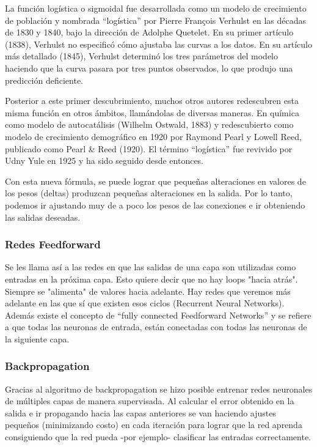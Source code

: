 \documentclass[a4paper]{article}
\begin{document}
La función logística o sigmoidal fue desarrollada como un modelo 
de crecimiento de población y nombrada ``logística'' por Pierre 
François Verhulst en las décadas de 1830 y 1840, bajo la dirección 
de Adolphe Quetelet\cite{wikipierre}.
En su primer artículo (1838), Verhulst no especificó cómo ajustaba 
las curvas a los datos. En su artículo más detallado (1845), 
Verhulst determinó los tres parámetros del modelo haciendo que la 
curva pasara por tres puntos observados, lo que produjo una 
predicción deficiente.

Posterior a este primer descubrimiento, muchos otros autores
redescubren esta misma función en otros ámbitos, llamándolas de
diversas maneras. En química como modelo de autocatálisis (Wilhelm 
Ostwald, 1883) y redescubierto como modelo de crecimiento
demográfico en 1920 por Raymond Pearl y Lowell Reed, publicado 
como Pearl \& Reed (1920). El término ``logística'' fue revivido 
por Udny Yule en 1925 y ha sido seguido desde entonces.


Con esta nueva fórmula, se puede lograr que pequeñas alteraciones 
en valores de los pesos (deltas) produzcan pequeñas alteraciones 
en la salida. Por lo tanto, podemos ir ajustando muy de a poco los 
pesos de las conexiones e ir obteniendo las salidas deseadas.

\subsubsection{Redes Feedforward}

Se les llama así a las redes en que las salidas de una capa son 
utilizadas como entradas en la próxima capa. Esto quiere decir que 
no hay loops "hacia atrás". Siempre se "alimenta" de valores hacia 
adelante. Hay redes que veremos más adelante en las que sí que 
existen esos ciclos (Recurrent Neural Networks). Además existe el 
concepto de ``fully connected Feedforward Networks'' y se refiere 
a que todas las neuronas de entrada, están conectadas con todas las 
neuronas de la siguiente capa.

\subsubsection{Backpropagation}

Gracias al algoritmo de backpropagation se hizo posible entrenar 
redes neuronales de múltiples capas de manera supervisada. Al 
calcular el error obtenido en la salida e ir propagando hacia las 
capas anteriores se van haciendo ajustes pequeños (minimizando 
costo) en cada iteración para lograr que la red aprenda 
consiguiendo que la red pueda -por ejemplo- clasificar las 
entradas correctamente.
\end{document}
